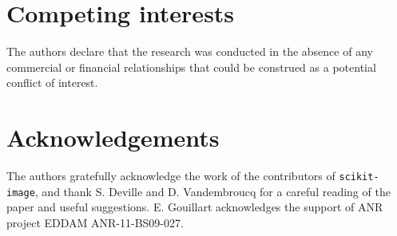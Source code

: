 \documentclass[twocolumn]{bmcart}%
\begin{document}
\begin{backmatter}

\section*{Competing interests}
The authors declare that the research was conducted
in the absence of any commercial or financial relationships that could be
construed as a potential conflict of interest.

\section*{Acknowledgements}
  
The authors gratefully acknowledge the work of the contributors of
  \texttt{scikit-image}, and thank S. Deville and D. Vandembroucq for a
  careful reading of the paper and useful suggestions. E. Gouillart
  acknowledges the support of ANR project EDDAM ANR-11-BS09-027. 


\nocite{label}



\end{backmatter}
\end{document}
